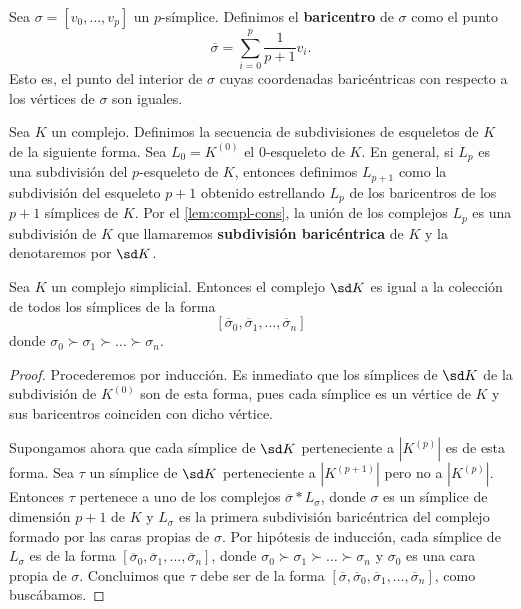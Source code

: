 \begin{definicion}
	Sea $\sigma = [v_0, \dots, v_p]$ un $p$-símplice. Definimos el \textbf{baricentro} de $\sigma$ como el punto
	\[
		\overline{\sigma} = \sum_{i=0}^{p}\frac{1}{p+1} v_i.
	\]
	Esto es, el punto del interior de $\sigma$ cuyas coordenadas baricéntricas con respecto a los vértices de $\sigma$ son iguales.
\end{definicion}
\begin{definicion}
	Sea $K$ un complejo. Definimos la secuencia de subdivisiones de esqueletos de $K$ de la siguiente forma. Sea $L_0 = K^{(0)}$ el $0$-esqueleto de $K$. En general, si $L_p$ es una subdivisión del $p$-esqueleto de $K$, entonces definimos $L_{p+1}$ como la subdivisión del esqueleto $p+1$ obtenido estrellando $L_p$ de los baricentros de los $p+1$ símplices de $K$. Por el \autoref{lem:compl-cons}, la unión de los complejos $L_p$ es una subdivisión de $K$ que llamaremos \textbf{subdivisión baricéntrica} de $K$ y la denotaremos por $\sd K$.
\end{definicion}
\begin{lema}
	Sea $K$ un complejo simplicial. Entonces el complejo $\sd K$ es igual a la colección de todos los símplices de la forma
	\[
		[\overline{\sigma}_0,\overline{\sigma}_1,\dots,\overline{\sigma}_n]
	\]
	donde $\sigma_0 \succ \sigma_1 \succ \dots \succ \sigma_n$.
\end{lema}
\begin{proof}
	Procederemos por inducción. Es inmediato que los símplices de $\sd K$ de la subdivisión de $K^{(0)}$ son de esta forma, pues cada símplice es un vértice de $K$ y sus baricentros coinciden con dicho vértice.

	Supongamos ahora que cada símplice de $\sd K$ perteneciente a $|K^{(p)}|$ es de esta forma. Sea $\tau$ un símplice de $\sd K$ perteneciente a $|K^{(p+1)}|$ pero no a $|K^{(p)}|$. Entonces $\tau$ pertenece a uno de los complejos $\overline{\sigma} \ast L_{\sigma}$, donde $\sigma$ es un símplice de dimensión $p+1$ de $K$ y $L_{\sigma}$ es la primera subdivisión baricéntrica del complejo formado por las caras propias de $\sigma$. Por hipótesis de inducción, cada símplice de $L_{\sigma}$ es de la forma $[\overline{\sigma}_0,\overline{\sigma}_1,\dots,\overline{\sigma}_n]$, donde $\sigma_0 \succ \sigma_1 \succ \dots \succ \sigma_n$ y $\sigma_0$ es una cara propia de $\sigma$. Concluimos que $\tau$ debe ser de la forma $[\overline{\sigma},\overline{\sigma}_0,\overline{\sigma}_1,\dots,\overline{\sigma}_n]$, como buscábamos.
\end{proof}

